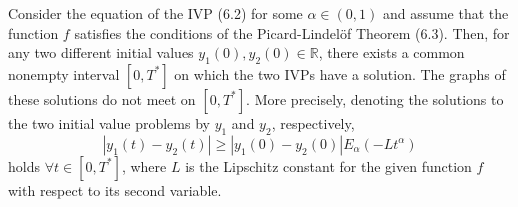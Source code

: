 \begin{minipage}{\textwidth}
    \begin{theorem}
        Consider the equation of the IVP (6.2) for some $\alpha \in (0, 1)$ and assume that the function
        $f$ satisfies the conditions of the Picard-Lindelöf Theorem (6.3). Then, for any two
        different initial values $y_1(0), y_2(0) \in \mathbb{R}$, there exists a common nonempty interval $[0, T^*]$ on
        which the two IVPs have a solution. The graphs of these solutions do not meet on $[0, T^*]$. 
        More precisely, denoting the solutions to the two initial value problems by $y_1$ and $y_2$, respectively,
        \[
            | y_1(t) - y_2(t)| \geq |y_1(0)-y_2(0)| E_{\alpha}(-Lt^\alpha)
        \]
        holds $\forall t \in [0, T^*]$, where $L$ is the Lipschitz constant for the given function $f$ with
        respect to its second variable.
    \end{theorem}
\end{minipage}

